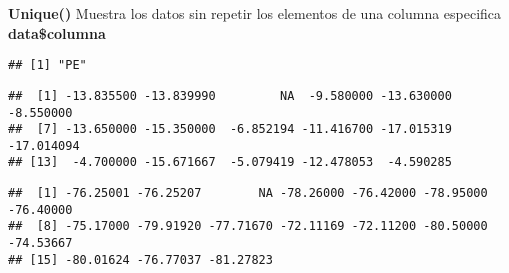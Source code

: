 \documentclass[
]{article}
\newenvironment{Shaded}{\begin{snugshade}}{\end{snugshade}}
\newcommand{\FunctionTok}[1]{\textcolor[rgb]{0.13,0.29,0.53}{\textbf{#1}}}
\newcommand{\NormalTok}[1]{#1}
\newcommand{\SpecialCharTok}[1]{\textcolor[rgb]{0.81,0.36,0.00}{\textbf{#1}}}
\begin{document}
\textbf{Unique()} Muestra los datos sin repetir los elementos de una
columna especifica \textbf{data\$columna}

\begin{Shaded}
\end{Shaded}

\begin{verbatim}
## [1] "PE"
\end{verbatim}

\begin{Shaded}
\end{Shaded}

\begin{verbatim}
##  [1] -13.835500 -13.839990         NA  -9.580000 -13.630000  -8.550000
##  [7] -13.650000 -15.350000  -6.852194 -11.416700 -17.015319 -17.014094
## [13]  -4.700000 -15.671667  -5.079419 -12.478053  -4.590285
\end{verbatim}

\begin{Shaded}
\end{Shaded}

\begin{verbatim}
##  [1] -76.25001 -76.25207        NA -78.26000 -76.42000 -78.95000 -76.40000
##  [8] -75.17000 -79.91920 -77.71670 -72.11169 -72.11200 -80.50000 -74.53667
## [15] -80.01624 -76.77037 -81.27823
\end{verbatim}

\begin{Shaded}
\end{Shaded}
\end{document}
